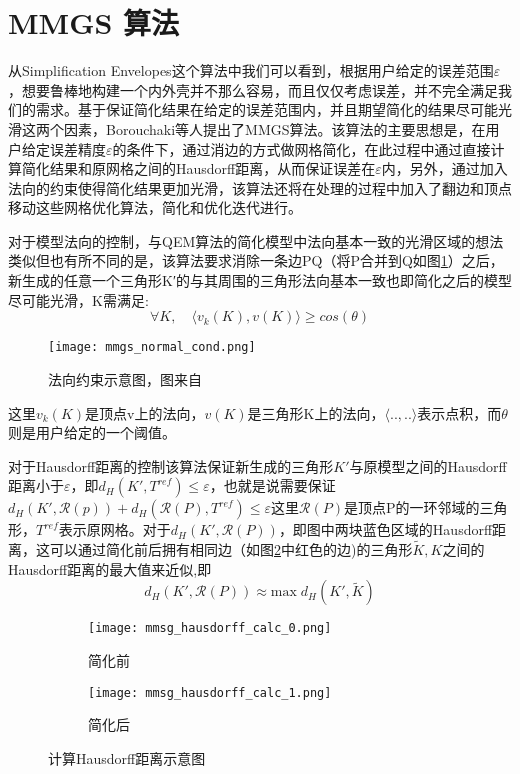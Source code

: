 \section{MMGS 算法}
从Simplification Envelopes\cite{simp-envlop}这个算法中我们可以看到，根据用户给定的误差范围$\varepsilon$，想要鲁棒地构建一个内外壳并不那么容易，而且仅仅考虑误差，并不完全满足我们的需求。基于保证简化结果在给定的误差范围内，并且期望简化的结果尽可能光滑这两个因素，Borouchaki等人提出了MMGS算法\cite{mmgs}。该算法的主要思想是，在用户给定误差精度$\varepsilon$的条件下，通过消边的方式做网格简化，在此过程中通过直接计算简化结果和原网格之间的Hausdorff距离，从而保证误差在$\varepsilon$内，另外，通过加入法向的约束使得简化结果更加光滑，该算法还将在处理的过程中加入了翻边和顶点移动这些网格优化算法，简化和优化迭代进行。\par
对于模型法向的控制，与QEM算法的简化模型中法向基本一致的光滑区域的想法类似但也有所不同的是，该算法要求消除一条边PQ（将P合并到Q如图\ref{fig:mmgs-normal-cond}）之后，新生成的任意一个三角形K′的与其周围的三角形法向基本一致也即简化之后的模型尽可能光滑，K需满足:
\begin{equation}
  \forall K, \quad \langle v_k (K), v(K) \rangle \ge cos(\theta)
\end{equation}
\begin{figure}[htbp]
    \centering
    \texttt{[image: mmgs\_normal\_cond.png]}
    \caption{法向约束示意图，图来自\cite{mmgs}}
    \label{fig:mmgs-normal-cond}
\end{figure}
这里$v_k(K)$是顶点v上的法向，$v(K)$是三角形K上的法向，$\langle ..,.. \rangle$表示点积，而$\theta$则是用户给定的一个阈值。\par
对于Hausdorff距离的控制该算法保证新生成的三角形$K'$与原模型之间的Hausdorff距离小于$\varepsilon$，即$d_H(K',T^{ref})\le\varepsilon$，也就是说需要保证$d_H(K',\mathcal{R}(p))+d_H(\mathcal{R}(P),T^{ref}) \le \varepsilon$这里$\mathcal{R}(P)$是顶点P的一环邻域的三角形，$T^{ref}$表示原网格。对于$d_H(K',\mathcal{R}(P))$，即图中两块蓝色区域的Hausdorff距离，这可以通过简化前后拥有相同边（如图\ref{fig:mmgs-calc-haus}中红色的边)的三角形$\widetilde{K},K$之间的Hausdorff距离的最大值来近似,即
\begin{equation}
  d_H(K', \mathcal{R}(P)) \approx \text{max} \; d_H(K',\widetilde{K})
\end{equation}
\begin{figure}[htbp]
  \centering
  \begin{subfigure}[b]{0.4\textwidth}
    \texttt{[image: mmsg\_hausdorff\_calc\_0.png]}
    \caption[input]{简化前}
    \end{subfigure}
    \begin{subfigure}[b]{0.4\textwidth}
      \texttt{[image: mmsg\_hausdorff\_calc\_1.png]}
      \caption[mls]{简化后}
    \end{subfigure}
    \caption[Result]{计算Hausdorff距离示意图}
    \label{fig:mmgs-calc-haus}
\end{figure}
